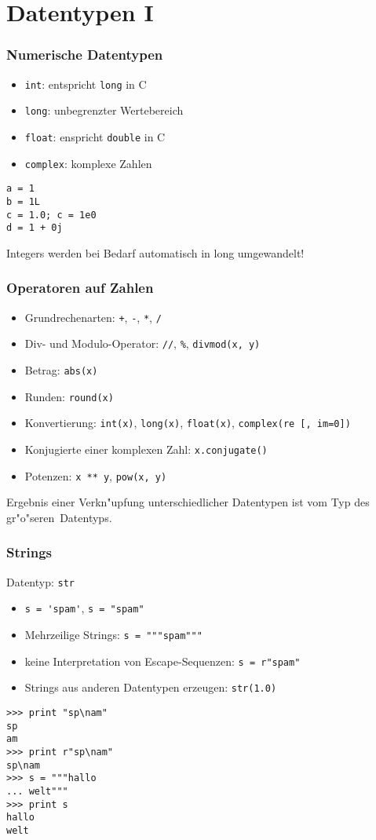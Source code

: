 \section{Datentypen I}

\begin{frame}[fragile]
\frametitle{Numerische Datentypen}
\begin{itemize}
\item \texttt{int}: entspricht \texttt{long} in C
\item \texttt{long}: unbegrenzter Wertebereich
\item \texttt{float}: enspricht \texttt{double} in C 
\item \texttt{complex}: komplexe Zahlen
\end{itemize} 
\begin{lstlisting}[style=Python]
a = 1
b = 1L
c = 1.0; c = 1e0
d = 1 + 0j
\end{lstlisting}
\vspace{3mm}
Integers werden bei Bedarf automatisch in long umgewandelt! 
\end{frame}

\begin{frame}
\frametitle{Operatoren auf Zahlen}
\begin{itemize}
\item Grundrechenarten: \texttt{+}, \texttt{-}, \texttt{*}, \texttt{/}
\item Div- und Modulo-Operator: \texttt{//}, \hspace{1mm}\texttt{\%}, \hspace{1mm}\texttt{divmod(x, y)}
\item Betrag: \texttt{abs(x)}
\item Runden: \texttt{round(x)}
\item Konvertierung: \texttt{int(x)}, \texttt{long(x)}, \texttt{float(x)}, \texttt{complex(re~[, im=0])}
\item Konjugierte einer komplexen Zahl: \texttt{x.conjugate()}
\item Potenzen: \texttt{x ** y}, \hspace{1mm}\texttt{pow(x, y)}
\end{itemize}
Ergebnis einer Verkn"upfung unterschiedlicher Datentypen ist vom Typ des \glqq gr"o"seren\grqq \, Datentyps.
\end{frame}

\begin{frame}[fragile]
\frametitle{Strings}
Datentyp: \texttt{str}
\begin{itemize}
\item \lstinline{s = 'spam'}, \lstinline{s = "spam"}
\item Mehrzeilige Strings: \lstinline{s = """spam"""}
\item keine Interpretation von Escape-Sequenzen: \lstinline{s = r"spam"}
\item Strings aus anderen Datentypen erzeugen: \lstinline{str(1.0)}
\end{itemize}
\begin{lstlisting}[style=Shell]
>>> print "sp\nam"
sp
am
>>> print r"sp\nam"
sp\nam
>>> s = """hallo
... welt"""
>>> print s
hallo
welt
\end{lstlisting}
\end{frame}

